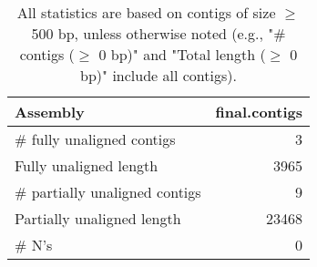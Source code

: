 \documentclass[12pt,a4paper]{article}
\begin{document}
\begin{table}[ht]
\begin{center}
\caption{All statistics are based on contigs of size $\geq$ 500 bp, unless otherwise noted (e.g., "\# contigs ($\geq$ 0 bp)" and "Total length ($\geq$ 0 bp)" include all contigs).}
\begin{tabular}{|l*{1}{|r}|}
\hline
Assembly & final.contigs \\ \hline
\# fully unaligned contigs & 3 \\ \hline
Fully unaligned length & 3965 \\ \hline
\# partially unaligned contigs & 9 \\ \hline
Partially unaligned length & 23468 \\ \hline
\# N's & 0 \\ \hline
\end{tabular}
\end{center}
\end{table}
\end{document}
